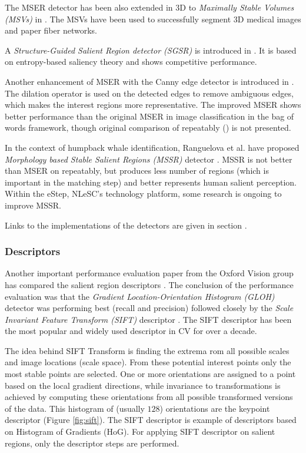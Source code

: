 The MSER detector has been also extended in 3D to {\em Maximally Stable Volumes (MSVs)} in \cite{DonoserB06}. The MSVs have been used to successfully segment 3D medical images and paper fiber networks.

A {\em Structure-Guided Salient Region detector (SGSR)} is introduced in \cite{Fan08}. It is based on entropy-based saliency theory and shows competitive performance.

Another enhancement of MSER with the Canny edge detector is introduced in \cite{Wang14}. The dilation operator is used on the detected edges to remove ambiguous edges, which makes the interest regions more representative. The improved MSER shows better performance than the original MSER in image classification in the bag of words framework, though original comparison of repeatably (\cite{Mikolajczyk:2005}) is not presented. 

In the context of humpback whale identification, Ranguelova et al. have proposed {\em Morphology based Stable Salient Regions (MSSR)} detector \cite{RangMSSR06, RangHumpb06} . MSSR is not better than MSER on repeatably, but produces less number of regions (which is important in the matching step) and better represents human salient perception. Within the eStep, NLeSC's technology platform, some research is ongoing to improve MSSR.

Links to the implementations of the detectors are given in section .

\subsubsection{Descriptors}
Another important performance evaluation paper from the Oxford Vision group has compared the salient region descriptors \cite{MS05}. The conclusion of the performance evaluation was that the {\em Gradient Location-Orientation Histogram (GLOH)} detector was performing best (recall and precision) followed closely by the {\em Scale Invariant Feature Transform (SIFT)} descriptor \cite{Lowe:2004}. The SIFT descriptor has been the most popular and widely used descriptor in CV for over a decade. 

The idea behind SIFT Transform is finding the extrema rom all possible scales and image locations (scale space). From these potential interest points only the most stable points are selected. One or more orientations are assigned to a point based on the local gradient directions, while invariance to transformations is achieved by computing these orientations from all possible transformed versions of the data.  This histogram of (usually $128$) orientations are the keypoint descriptor (Figure \ref{fig:sift}). The SIFT descriptor is example of descriptors based on Histogram of Gradients (HoG). For applying SIFT descriptor on salient regions, only the descriptor steps are performed. 


